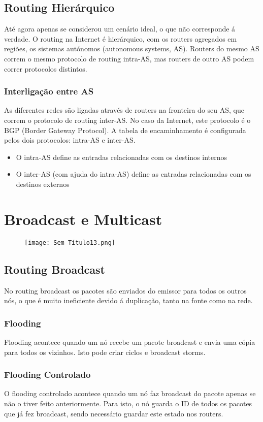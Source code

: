 \documentclass[10pt,a4paper]{report}
\begin{document}
\subsection{Routing Hierárquico}
Até agora apenas se considerou um cenário ideal, o que não corresponde á verdade. O routing na Internet é hierárquico, com os routers agregados em regiões, os sistemas autónomos (autonomous systems, AS). Routers do mesmo AS correm o mesmo protocolo de routing intra-AS, mas routers de outro AS podem correr protocolos distintos.
\subsubsection{Interligação entre AS}
As diferentes redes são ligadas através de routers na fronteira do seu AS, que correm o protocolo de routing inter-AS. No caso da Internet, este protocolo é o BGP (Border Gateway Protocol). A tabela de encaminhamento é configurada pelos dois protocolos: intra-AS e inter-AS.
\begin{itemize}
\item O intra-AS define as entradas relacionadas com os destinos internos
\item O inter-AS (com ajuda do intra-AS) define as entradas relacionadas com os destinos externos
\end{itemize}
\section{Broadcast e Multicast}
\begin{figure}[H]
\centering
\texttt{[image: Sem Título13.png]}
\end{figure}
\subsection{Routing Broadcast}
No routing broadcast os pacotes são enviados do emissor para todos os outros nós, o que é muito ineficiente devido á duplicação, tanto na fonte como na rede.
\subsubsection{Flooding}
Flooding acontece quando um nó recebe um pacote broadcast e envia uma cópia para todos os vizinhos. Isto pode criar ciclos e broadcast storms.
\subsubsection{Flooding Controlado}
O flooding controlado acontece quando um nó faz broadcast do pacote apenas se não o tiver feito anteriormente. Para isto, o nó guarda o ID de todos os pacotes que já fez broadcast, sendo necessário guardar este estado nos routers.
\end{document}
